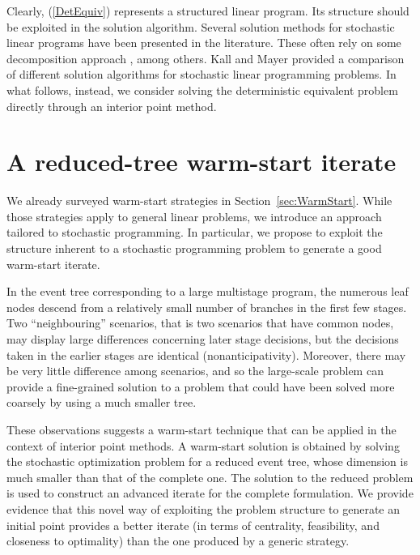 Clearly, (\ref{DetEquiv}) represents a structured linear program. Its 
structure should be exploited in the solution algorithm.
Several solution methods for stochastic linear programs have been 
presented in the literature. These often rely on some decomposition
approach \cite{Birge85,LinderothWright03,MulveyRuszczynski}, among others.
Kall and Mayer \cite{KallMayer} provided a comparison of different
solution algorithms for stochastic linear programming problems.
In what follows, instead, we consider solving the deterministic equivalent
problem directly through an interior point method.


%
%
\section{A reduced-tree warm-start iterate}
\label{sec:ReducedTree}

We already surveyed warm-start strategies in Section~\ref{sec:WarmStart}.
While those strategies apply to
general linear problems, we introduce an approach tailored to
stochastic programming. In particular, we propose to exploit the structure
inherent to a stochastic programming problem to generate a good 
warm-start iterate.

In the event tree corresponding to a large multistage program, 
the numerous leaf nodes descend from a relatively small number of 
branches in the first few stages. Two ``neighbouring'' scenarios, 
that is two scenarios that have common nodes, may display large 
differences concerning later stage decisions, but the decisions 
taken in the earlier stages are identical (nonanticipativity).
Moreover, there may be very little difference among 
scenarios, and so the large-scale problem can provide a fine-grained 
solution to a problem that could have been solved more coarsely by 
using a much smaller tree. 

These observations suggests a
warm-start technique that can be applied in the context of interior 
point methods. A warm-start solution is obtained by solving the 
stochastic optimization problem for a reduced event tree, whose 
dimension is much smaller than that of the complete one. The solution 
to the reduced problem is used to construct an advanced iterate for 
the complete formulation. We provide evidence that this novel way 
of exploiting the problem structure to generate an initial point 
provides a better iterate (in terms of centrality, feasibility, 
and closeness to optimality) than the one produced by a generic 
strategy.

